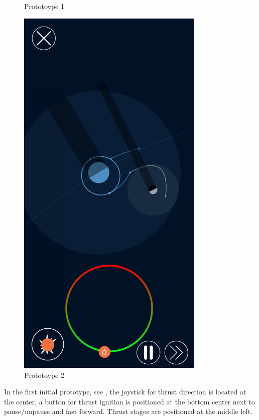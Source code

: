 \documentclass[runningheads]{llncs}
\begin{document}
\begin{figure}[!htb]
\begin{minipage}{.5\textwidth}
      \caption{Prototoype 1}
      \label{fig:prot1}
  \end{minipage}%
  \begin{minipage}{0.5\textwidth}
      \centering
      \includegraphics[width=0.8\textwidth]{Prototype2.png}
      \caption{Prototoype 2}
      \label{fig:prot2}
  \end{minipage}
\end{figure}

In the first initial prototype, see , the joystick for thrust direction is located at the center, a button for thrust
ignition is positioned at the bottom center next to pause/unpause and fast forward. Thrust stages are positioned at the middle
left.
\end{document}
